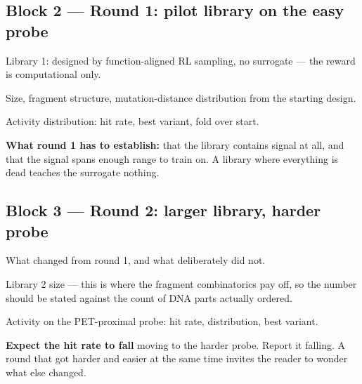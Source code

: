 \subsection*{Block 2 --- Round 1: pilot library on the easy probe}
\begin{planlist}
  \item Library 1: designed by function-aligned RL sampling, no surrogate ---
        the reward is computational only.
  \item Size, fragment structure, mutation-distance distribution from the
        starting design.
  \item Activity distribution: hit rate, best variant, fold over start.
  \item \textbf{What round 1 has to establish:} that the library contains
        signal at all, and that the signal spans enough range to train on. A
        library where everything is dead teaches the surrogate nothing.
\end{planlist}

\subsection*{Block 3 --- Round 2: larger library, harder probe}
\begin{planlist}
  \item What changed from round 1, and what deliberately did not.
  \item Library 2 size --- this is where the fragment combinatorics pay off, so
        the number should be stated against the count of DNA parts actually
        ordered.
  \item Activity on the PET-proximal probe: hit rate, distribution, best
        variant.
  \item \textbf{Expect the hit rate to fall} moving to the harder probe. Report
        it falling. A round that got harder and easier at the same time invites
        the reader to wonder what else changed.
\end{planlist}

